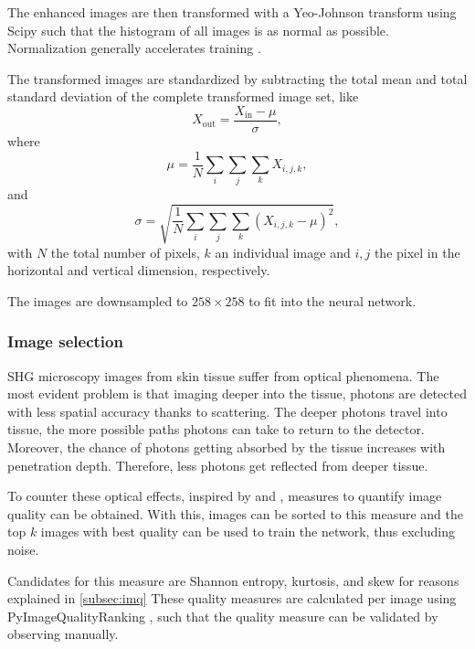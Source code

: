 The enhanced images are then transformed with a Yeo-Johnson transform using Scipy \cite{2020SciPy-NMeth} such that the histogram of all images is as normal as possible.
Normalization generally accelerates training \cite{Huang2020}.

The transformed images are standardized by subtracting the total mean and total standard deviation of the complete transformed image set, like
\begin{equation}
    X_\mathrm{out} = \frac{X_\mathrm{in} - \mu}{\sigma},
\end{equation}
where
\begin{equation}
    \mu = \frac{1}{N} \sum_i \sum_j \sum_k X_{i,j,k},
\end{equation}
and
\begin{equation}
    \sigma = \sqrt{\frac{1}{N} \sum_i \sum_j \sum_k \left(X_{i,j,k} - \mu\right)^2},
\end{equation}
with $N$ the total number of pixels, $k$ an individual image and $i,j$ the pixel in the horizontal and vertical dimension, respectively.

The images are downsampled to $258\times258$ to fit into the neural network.

\subsubsection{Image selection}
SHG microscopy images from skin tissue suffer from optical phenomena.
The most evident problem is that imaging deeper into the tissue, photons are detected with less spatial accuracy thanks to scattering.
The deeper photons travel into tissue, the more possible paths photons can take to return to the detector.
Moreover, the chance of photons getting absorbed by the tissue increases with penetration depth.
Therefore, less photons get reflected from deeper tissue.

To counter these optical effects, inspired by \textcite{Koho2016} and \textcite{Blokker2022}, measures to quantify image quality can be obtained.
With this, images can be sorted to this measure and the top $k$ images with best quality can be used to train the network, thus excluding noise.

Candidates for this measure are Shannon entropy, kurtosis, and skew for reasons explained in \ref{subsec:imq}
These quality measures are calculated per image using PyImageQualityRanking \cite{Koho2016}, such that the quality measure can be validated by observing manually.

